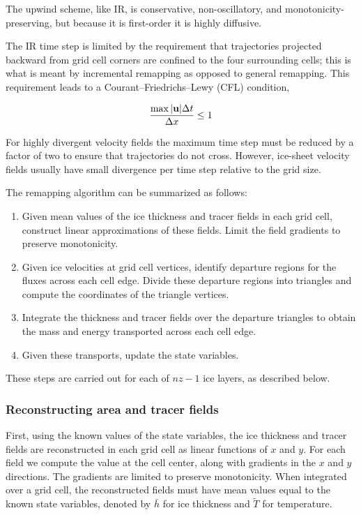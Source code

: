 \noindent
The upwind scheme, like IR, is conservative, non-oscillatory, and
monotonicity-preserving, but because it is first-order it is highly diffusive.

The IR time step is limited by the requirement that trajectories
projected backward from grid cell corners are confined to the four
surrounding cells; this is what is meant by incremental
remapping as opposed to general remapping. This requirement leads to a 
Courant--Friedrichs--Lewy (CFL) condition, 

\begin{equation}
\label{eq:CFL}
  \frac{\max|{\bf u}|\Delta t} {\Delta x} \leq 1 
\end{equation}

\noindent
For highly divergent velocity fields the maximum time
step must be reduced by a factor of two to ensure that
trajectories do not cross.  However, ice-sheet velocity fields
usually have small divergence per time step relative to the grid size.

The remapping algorithm can be summarized as follows:
\begin{enumerate}
\item Given mean values of the ice thickness and tracer fields in each
      grid cell, construct linear approximations of these fields.
      Limit the field gradients to preserve monotonicity.
\item Given ice velocities at grid cell vertices, identify departure
      regions for the fluxes across each cell edge.  Divide these
      departure regions into triangles and compute the coordinates
      of the triangle vertices.
\item Integrate the thickness and tracer fields over the departure triangles to obtain
      the mass and energy transported across each cell edge.
\item Given these transports, update the state variables.
\end{enumerate}
These steps are carried out for each of $nz-1$ ice layers, as described below.

\subsubsection{Reconstructing area and tracer fields}
\label{sc:glissade-IR-reconstruct}

First, using the known values of the state variables, the ice thickness
and tracer fields are reconstructed in each grid cell as linear
functions of $x$ and $y$. For each field we compute the value at
the cell center, along with gradients in the
$x$ and $y$ directions. The gradients are limited to preserve
monotonicity.  When integrated over a grid cell, the reconstructed
fields must have mean values equal to the known state variables,
denoted by $\bar{h}$ for ice thickness and $\tilde{T}$ for temperature.

